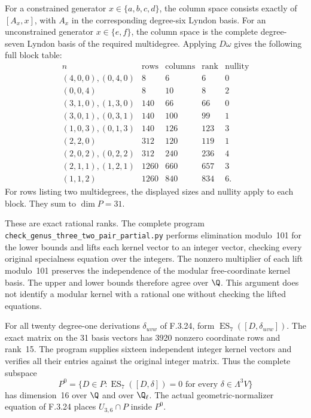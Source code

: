 For a constrained generator $x\in\{a,b,c,d\}$,
the column space consists exactly of
$[A_x,x]$, with $A_x$ in the corresponding
degree-six Lyndon basis. For an unconstrained
generator $x\in\{e,f\}$, the column space
is the complete degree-seven Lyndon basis
of the required multidegree. Applying
$D\omega$ gives the following full block table:
\[
\begin{array}{c|r|r|r|r}
n&\text{rows}&\text{columns}&\text{rank}&\text{nullity}\\\hline
(4,0,0),(0,4,0)&8&6&6&0\\
(0,0,4)&8&10&8&2\\
(3,1,0),(1,3,0)&140&66&66&0\\
(3,0,1),(0,3,1)&140&100&99&1\\
(1,0,3),(0,1,3)&140&126&123&3\\
(2,2,0)&312&120&119&1\\
(2,0,2),(0,2,2)&312&240&236&4\\
(2,1,1),(1,2,1)&1260&660&657&3\\
(1,1,2)&1260&840&834&6.
\end{array}                                               \tag{PT.4}
\]
For rows listing two multidegrees, the displayed
sizes and nullity apply to each block. They sum
to $\dim P=31$.

These are exact rational ranks. The complete
program \texttt{check\_genus\_three\_two\_pair\_partial.py}
performs elimination modulo~101 for the lower
bounds and lifts each kernel vector to an
integer vector, checking every original
specialness equation over the integers.
The nonzero multiplier of each lift modulo~101
preserves the independence of the modular
free-coordinate kernel basis. The upper and
lower bounds therefore agree over $\Q$.
This argument does not identify a modular
kernel with a rational one without checking
the lifted equations.

For all twenty degree-one derivations
$\delta_{uvw}$ of F.3.24, form
$\operatorname{ES}_7([D,\delta_{uvw}])$.
The exact matrix on the 31 basis vectors has
3920 nonzero coordinate rows and rank~15.
The program supplies sixteen independent
integer kernel vectors and verifies all their
entries against the original integer matrix.
Thus the complete subspace
\[
 P^0=\{D\in P:\operatorname{ES}_7([D,\delta])=0
                      \text{ for every }\delta\in\Lambda^3V\}
\]
has dimension~16 over $\Q$ and over $\Q_\ell$.
The actual geometric-normalizer equation of
F.3.24 places $U_{3,6}\cap P$ inside $P^0$.

